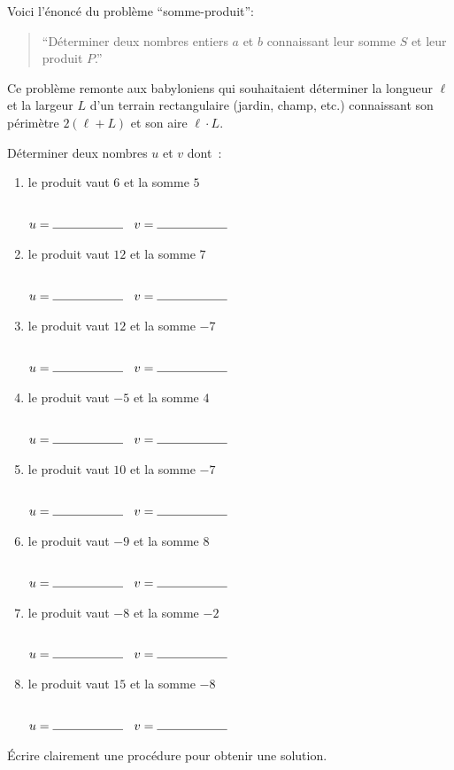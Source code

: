 \documentclass[a4paper,12pt]{article}
\begin{document}
\begin{activite}
	\tcblower
Voici l'énoncé du problème \enquote{somme-produit}:
\begin{quote}
\enquote{Déterminer deux nombres entiers $a$ et $b$ connaissant leur somme $S$ et leur produit $P$.} 
\end{quote}
Ce problème remonte aux babyloniens qui souhaitaient déterminer la longueur $\ell$ et la largeur $L$ d'un terrain rectangulaire (jardin, champ, etc.) connaissant son périmètre $2(\ell+L)$ et son aire $\ell\cdot L$. 

\begin{tasks}
\task Déterminer deux nombres $u$ et $v$ dont~:
\begin{multicols}{2}
	\begin{enumerate}
\item le produit vaut $6$ et la somme $5$

$u=\ligne{2}$ $v=\ligne{2}$
\item le produit vaut $12$ et la somme $7$

$u=\ligne{2}$ $v=\ligne{2}$
\item le produit vaut $12$ et la somme $-7$

$u=\ligne{2}$ $v=\ligne{2}$
\item le produit vaut $-5$ et la somme $4$

$u=\ligne{2}$ $v=\ligne{2}$
\item le produit vaut $10$ et la somme $-7$

$u=\ligne{2}$ $v=\ligne{2}$
\item le produit vaut $-9$ et la somme $8$

$u=\ligne{2}$ $v=\ligne{2}$
\item le produit vaut $-8$ et la somme $-2$

$u=\ligne{2}$ $v=\ligne{2}$
\item le produit vaut $15$ et la somme $-8$

$u=\ligne{2}$ $v=\ligne{2}$
\end{enumerate}
\end{multicols}

\task Écrire clairement une procédure pour obtenir une solution.  

	\vspace{15pt}
	\myrulefill
	\vspace{15pt}

	\myrulefill
	\vspace{15pt}

	\myrulefill


\end{tasks}
\end{activite}
\end{document}
